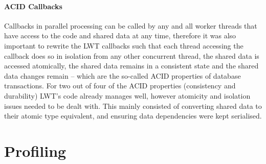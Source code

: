 \documentclass[12pt,twoside,notitlepage]{report}
\begin{document}
\paragraph{ACID Callbacks}
\label{para:acid_callbacks}
Callbacks in parallel processing can be called by any and all worker threads that have access to the code and shared data at any time, therefore it was also important to rewrite the LWT callbacks such that each thread accessing the
callback does so in isolation from any other concurrent thread, the shared data is accessed atomically, the shared data remains in a consistent state and the shared data changes remain -- which are the so-called ACID properties of
database transactions. For two out of four of the ACID properties (consistency and durability) LWT's code already manages well, however atomicity and isolation issues needed to be dealt with. This mainly consisted of converting shared
data to their atomic type equivalent, and ensuring data dependencies were kept serialised.

\section{Profiling}
\label{sec:profiling}
%
%

%
%

%
%
\end{document}
